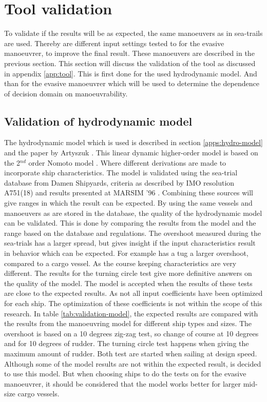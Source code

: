 \section{Tool validation}
\label{sec:manoeuvrer-results}
To validate if the results will be as expected, the same manoeuvers as in sea-trails are used. Thereby are different input settings tested to for the evasive manoeuvrer, to improve the final result. These manoeuvers are described in the previous section. This section will discuss the validation of the tool as discussed in appendix \ref{app:tool}. This is first done for the used hydrodynamic model. And than for the evasive manoeuvrer which will be used to determine the dependence of decision domain on manoeuvrability. 

\subsection{Validation of hydrodynamic model}
The hydrodynamic model which is used is described in section \ref{apps:hydro-model} and the paper by Artyszuk \cite{Artyszuk2016}. This linear dynamic higher-order model is based on the 2$^{nd}$ order Nomoto model \cite{Nomoto1957}. Where different derivations are made to incorporate ship characteristics. 
The model is validated using the sea-trial database from Damen Shipyards, criteria as described by IMO resolution A751(18) \cite{Quadvlieg2003} and results presented at MARSIM '96 \cite{MARSIM1996}. Combining these sources will give ranges in which the result can be expected. By using the same vessels and manoeuvers as are stored in the database, the quality of the hydrodynamic model can be validated. This is done by comparing the results from the model and the range based on the database and regulations. The overshoot measured during the sea-trials has a larger spread, but gives insight if the input characteristics result in behavior which can be expected. For example has a tug a larger overshoot, compared to a cargo vessel. As the course keeping characteristics are very different. The results for the turning circle test give more definitive answers on the quality of the model. The model is accepted when the results of these tests are close to the expected results. As not all input coefficients have been optimized for each ship. The optimization of these coefficients is not within the scope of this research. In table \ref{tab:validation-model}, the expected results are compared with the results from the manoeuvring model for different ship types and sizes. The overshoot is based on a 10 degrees zig-zag test, so change of course at 10 degrees and for 10 degrees of rudder. The turning circle test happens when giving the maximum amount of rudder. Both test are started when sailing at design speed. Although some of the model results are not within the expected result, is decided to use this model. But when choosing ships to do the tests on for the evasive manoeuvrer, it should be considered that the model works better for larger mid-size cargo vessels.

